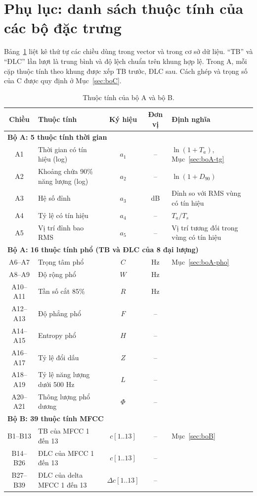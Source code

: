 \documentclass[11pt,a4paper]{article}
\begin{document}
\section*{Phụ lục: danh sách thuộc tính của các bộ đặc trưng}
Bảng~\ref{tab:thuoctinh} liệt kê thứ tự các chiều dùng trong vector và trong cơ sở dữ liệu. ``TB'' và ``ĐLC'' lần lượt là trung bình và độ lệch chuẩn trên khung hợp lệ. Trong A, mỗi cặp thuộc tính theo khung được xếp TB trước, ĐLC sau. Cách ghép và trọng số của C được quy định ở Mục~\ref{sec:boC}.
\begin{table}[htbp]
\centering\small
\caption{Thuộc tính của bộ A và bộ B.}\label{tab:thuoctinh}
\begin{tabularx}{\textwidth}{clccX}
\toprule
Chiều & Thuộc tính & Ký hiệu & Đơn vị & Định nghĩa\\\midrule
\multicolumn{5}{l}{\textbf{Bộ A: 5 thuộc tính thời gian}}\\
A1 & Thời gian có tín hiệu (log) & $a_1$ & -- & $\ln(1+T_a)$, Mục~\ref{sec:boA-tg}\\
A2 & Khoảng chứa 90\% năng lượng (log) & $a_2$ & -- & $\ln(1+D_{90})$\\
A3 & Hệ số đỉnh & $a_3$ & dB & Đỉnh so với RMS vùng có tín hiệu\\
A4 & Tỷ lệ có tín hiệu & $a_4$ & -- & $T_a/T_s$\\
A5 & Vị trí đỉnh bao RMS & $a_5$ & -- & Vị trí tương đối trong vùng có tín hiệu\\\midrule
\multicolumn{5}{l}{\textbf{Bộ A: 16 thuộc tính phổ (TB và ĐLC của 8 đại lượng)}}\\
A6--A7 & Trọng tâm phổ & $C$ & Hz & Mục~\ref{sec:boA-pho}\\
A8--A9 & Độ rộng phổ & $W$ & Hz & \\
A10--A11 & Tần số cắt 85\% & $R$ & Hz & \\
A12--A13 & Độ phẳng phổ & $F$ & -- & \\
A14--A15 & Entropy phổ & $H$ & -- & \\
A16--A17 & Tỷ lệ đổi dấu & $Z$ & -- & \\
A18--A19 & Tỷ lệ năng lượng dưới 500 Hz & $L$ & -- & \\
A20--A21 & Thông lượng phổ dương & $\Phi$ & -- & \\\midrule
\multicolumn{5}{l}{\textbf{Bộ B: 39 thuộc tính MFCC}}\\
B1--B13 & TB của MFCC 1 đến 13 & $c[1..13]$ & -- & Mục~\ref{sec:boB}\\
B14--B26 & ĐLC của MFCC 1 đến 13 & $c[1..13]$ & -- & \\
B27--B39 & ĐLC của delta MFCC 1 đến 13 & $\Delta c[1..13]$ & -- & \\\bottomrule
\end{tabularx}
\end{table}
\clearpage
\end{document}
